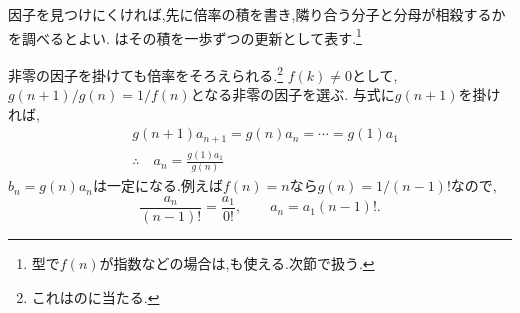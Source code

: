     因子を見つけにくければ,先に倍率の積を書き,隣り合う分子と分母が相殺するかを調べるとよい.
    はその積を一歩ずつの更新として表す.\footnote{型で$f(n)$が指数などの場合は,も使える.次節で扱う.}

\label{解釈：階比と正規化}
    非零の因子を掛けても倍率をそろえられる.\footnote{これはのに当たる.}
    $f(k)\ne0$として,$g(n+1)/g(n)=1/f(n)$となる非零の因子を選ぶ.
    与式に$g(n+1)$を掛ければ,
    \begin{align*}
      &g(n+1)a_{n+1}=g(n)a_n=\cdots=g(1)a_1\\
      &\therefore \quad a_n=\frac{g(1)a_1}{g(n)}
    \end{align*}
    $b_n=g(n)a_n$は一定になる.例えば$f(n)=n$なら$g(n)=1/(n-1)!$なので,
    \[
      \frac{a_n}{(n-1)!}=\frac{a_1}{0!},\qquad a_n=a_1(n-1)!.
    \]
